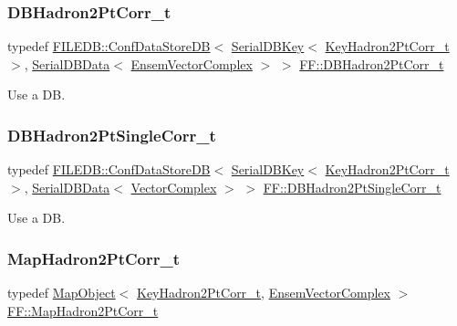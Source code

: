 \subsubsection{\texorpdfstring{DBHadron2PtCorr\_t}{DBHadron2PtCorr\_t}}
{\footnotesize\ttfamily typedef \mbox{\hyperlink{classFILEDB_1_1ConfDataStoreDB}{F\+I\+L\+E\+D\+B\+::\+Conf\+Data\+Store\+DB}}$<$ \mbox{\hyperlink{classADATIO_1_1SerialDBKey}{Serial\+D\+B\+Key}}$<$ \mbox{\hyperlink{structFF_1_1KeyHadron2PtCorr__t}{Key\+Hadron2\+Pt\+Corr\+\_\+t}} $>$, \mbox{\hyperlink{classADATIO_1_1SerialDBData}{Serial\+D\+B\+Data}}$<$ \mbox{\hyperlink{group__defs_ga13b984332760feb8bc9c8f1071ade9ef}{Ensem\+Vector\+Complex}} $>$ $>$ \mbox{\hyperlink{namespaceFF_a01cd8ed6e36964833ba6609588a44ad0}{F\+F\+::\+D\+B\+Hadron2\+Pt\+Corr\+\_\+t}}}



Use a DB. 

\mbox{\label{namespaceFF_af452a146ecdd7f49ca3ca53a13987359}} 
\subsubsection{\texorpdfstring{DBHadron2PtSingleCorr\_t}{DBHadron2PtSingleCorr\_t}}
{\footnotesize\ttfamily typedef \mbox{\hyperlink{classFILEDB_1_1ConfDataStoreDB}{F\+I\+L\+E\+D\+B\+::\+Conf\+Data\+Store\+DB}}$<$ \mbox{\hyperlink{classADATIO_1_1SerialDBKey}{Serial\+D\+B\+Key}}$<$ \mbox{\hyperlink{structFF_1_1KeyHadron2PtCorr__t}{Key\+Hadron2\+Pt\+Corr\+\_\+t}} $>$, \mbox{\hyperlink{classADATIO_1_1SerialDBData}{Serial\+D\+B\+Data}}$<$ \mbox{\hyperlink{group__defs_gab151d837d71acacce0e1c38e91e04fa3}{Vector\+Complex}} $>$ $>$ \mbox{\hyperlink{namespaceFF_af452a146ecdd7f49ca3ca53a13987359}{F\+F\+::\+D\+B\+Hadron2\+Pt\+Single\+Corr\+\_\+t}}}



Use a DB. 

\mbox{\label{namespaceFF_a11c2f2c7c42aaa20cce9292541df810a}} 
\subsubsection{\texorpdfstring{MapHadron2PtCorr\_t}{MapHadron2PtCorr\_t}}
{\footnotesize\ttfamily typedef \mbox{\hyperlink{classADAT_1_1MapObject}{Map\+Object}}$<$ \mbox{\hyperlink{structFF_1_1KeyHadron2PtCorr__t}{Key\+Hadron2\+Pt\+Corr\+\_\+t}}, \mbox{\hyperlink{group__defs_ga13b984332760feb8bc9c8f1071ade9ef}{Ensem\+Vector\+Complex}} $>$ \mbox{\hyperlink{namespaceFF_a11c2f2c7c42aaa20cce9292541df810a}{F\+F\+::\+Map\+Hadron2\+Pt\+Corr\+\_\+t}}}



